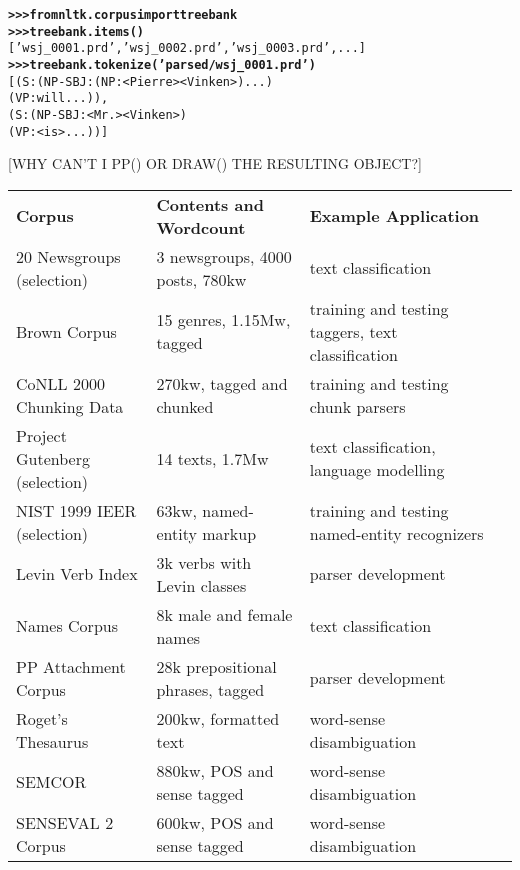 \documentclass[11pt]{article}
\begin{document}
\begin{alltt}
\textbf{>>> from nltk.corpus import treebank}
\textbf{>>> treebank.items()}
['wsj_0001.prd', 'wsj_0002.prd', 'wsj_0003.prd', ...]
\textbf{>>> treebank.tokenize('parsed/wsj_0001.prd')}
[ (S: (NP-SBJ: (NP: <Pierre> <Vinken>) ...)
        (VP: will ...)),
  (S: (NP-SBJ: <Mr.> <Vinken>)
        (VP: <is> ...)) ]
\end{alltt}
%
[WHY CAN'T I PP() OR DRAW() THE RESULTING OBJECT?]


\begin{table*}
\small\noindent
\begin{boxedminipage}{\linewidth}
\begin{tabular}{llll}
\textbf{Corpus} &
\textbf{Contents and Wordcount} &
\textbf{Example Application} \\

20 Newsgroups (selection) &
3 newsgroups, 4000 posts, 780kw &
text classification \\

Brown Corpus &
15 genres, 1.15Mw, tagged &
training and testing taggers, text classification \\

CoNLL 2000 Chunking Data &
270kw, tagged and chunked &
training and testing chunk parsers \\

Project Gutenberg (selection) &
14 texts, 1.7Mw &
text classification, language modelling \\

NIST 1999 IEER (selection) &
63kw, named-entity markup &
training and testing named-entity recognizers \\

Levin Verb Index &
3k verbs with Levin classes &
parser development \\

Names Corpus &
8k male and female names &
text classification \\

PP Attachment Corpus &
28k prepositional phrases, tagged &
parser development \\

Roget's Thesaurus &
200kw, formatted text &
word-sense disambiguation \\

SEMCOR &
880kw, POS and sense tagged &
word-sense disambiguation \\

SENSEVAL 2 Corpus &
600kw, POS and sense tagged &
word-sense disambiguation \\


\end{tabular}
\end{boxedminipage}
\end{table*}
\end{document}
